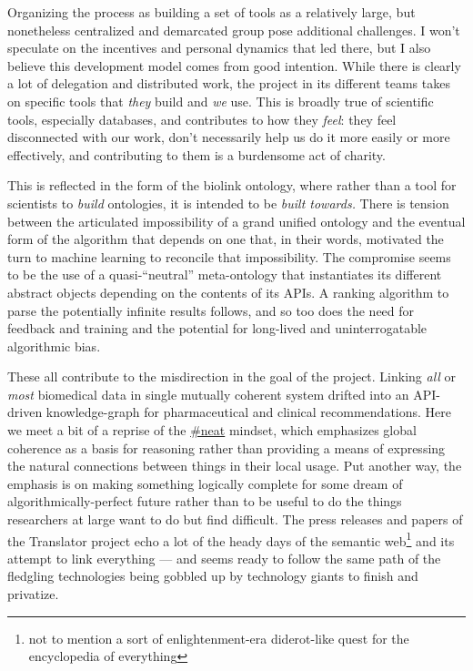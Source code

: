 \documentclass[10pt]{article}
\begin{document}
\begin{multicols}{2}
Organizing the process as building a set of tools as a relatively large,
but nonetheless centralized and demarcated group pose additional
challenges. I won't speculate on the incentives and personal dynamics
that led there, but I also believe this development model comes from
good intention. While there is clearly a lot of delegation and
distributed work, the project in its different teams takes on specific
tools that \emph{they} build and \emph{we} use. This is broadly true of
scientific tools, especially databases, and contributes to how they
\emph{feel}: they feel disconnected with our work, don't necessarily
help us do it more easily or more effectively, and contributing to them
is a burdensome act of charity.

This is reflected in the form of the biolink ontology, where rather than
a tool for scientists to \emph{build} ontologies, it is intended to be
\emph{built towards.} There is tension between the articulated
impossibility of a grand unified ontology and the eventual form of the
algorithm that depends on one that, in their words, motivated the turn
to machine learning to reconcile that impossibility. The compromise
seems to be the use of a quasi-``neutral'' meta-ontology that
instantiates its different abstract objects depending on the contents of
its APIs. A ranking algorithm to parse the potentially infinite results
follows, and so too does the need for feedback and training and the
potential for long-lived and uninterrogatable algorithmic bias.

These all contribute to the misdirection in the goal of the project.
Linking \emph{all} or \emph{most} biomedical data in single mutually
coherent system drifted into an API-driven knowledge-graph for
pharmaceutical and clinical recommendations. Here we meet a bit of a
reprise of the \protect\hyperlink{neatness-vs-scruffiness}{\#neat}
mindset, which emphasizes global coherence as a basis for reasoning
rather than providing a means of expressing the natural connections
between things in their local usage. Put another way, the emphasis is on
making something logically complete for some dream of
algorithmically-perfect future rather than to be useful to do the things
researchers at large want to do but find difficult. The press releases
and papers of the Translator project echo a lot of the heady days of the
semantic web\footnote{not to mention a sort of enlightenment-era
  diderot-like quest for the encyclopedia of everything} and its attempt
to link everything --- and seems ready to follow the same path of the
fledgling technologies being gobbled up by technology giants to finish
and privatize.


\end{multicols}
\end{document}
